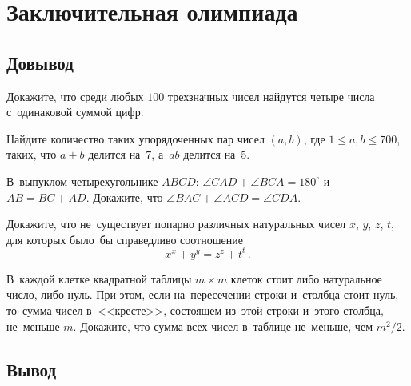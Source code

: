 
\section*{Заключительная олимпиада}


\subsection*{Довывод}

\begin{problems}

\item
Докажите, что среди любых $100$ трехзначных чисел найдутся четыре числа
с~одинаковой суммой цифр.

\item
Найдите количество таких упорядоченных пар чисел $(a, b)$, где
$1 \leq a, b \leq 700$, таких, что $a + b$ делится на~$7$,
а~$ab$ делится на~$5$.

\item
В~выпуклом четырехугольнике $ABCD$:
$\angle CAD + \angle BCA = 180^{\circ}$ и~$AB = BC + AD$.
Докажите, что $\angle BAC + \angle ACD = \angle CDA$.

\item
Докажите, что не~существует попарно различных натуральных чисел
$x$, $y$, $z$, $t$, для которых было~бы справедливо соотношение
\[
   x^x + y^y = z^z + t^t
\, . \]

\item
В~каждой клетке квадратной таблицы $m \times m$ клеток стоит либо натуральное
число, либо нуль.
При этом, если на~пересечении строки и~столбца стоит нуль, то~сумма чисел
в~<<кресте>>, состоящем из~этой строки и~этого столбца, не~меньше $m$.
Докажите, что сумма всех чисел в~таблице не~меньше, чем $m^2 / 2$.

\end{problems}


\subsection*{Вывод}

